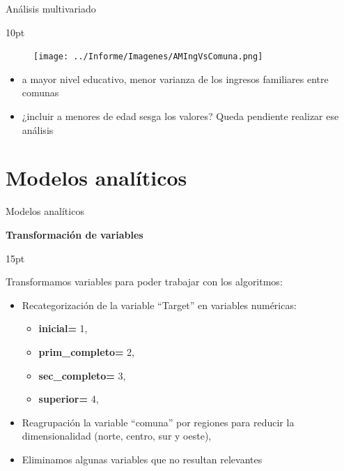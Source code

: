 \documentclass[pdf]{beamer}
\def\vspace{}%
\begin{document}
{\begin{frame}{Análisis multivariado}
    \begin{minipage}{0.55\textwidth}
        \vspace{10pt}
        \begin{figure} 
        \texttt{[image: ../Informe/Imagenes/AMIngVsComuna.png]}
        \end{figure}
    \end{minipage}
    \begin{minipage}{0.38\textwidth}
        \begin{itemize}
            \justifying%
            \item a mayor nivel educativo, menor varianza de los ingresos familiares entre comunas
            \item ¿incluir a menores de edad sesga los valores? Queda pendiente realizar ese análisis
        \end{itemize}
    \end{minipage}

\end{frame}

\section{Modelos analíticos}

\begin{frame}{Modelos analíticos}

    \begin{Large}
        \textbf{Transformación de variables}
    \end{Large}
    \vspace{15pt}

    Transformamos variables para poder trabajar con los algoritmos:
    \begin{itemize}
        \item Recategorización de la variable ``Target'' en variables numéricas:
        \begin{itemize}
            \item \textbf{inicial=} 1,
            \item \textbf{prim\_completo=} 2,
            \item \textbf{sec\_completo=} 3,
            \item \textbf{superior=} 4,
        \end{itemize}
        \item Reagrupación la variable ``comuna'' por regiones para reducir la dimensionalidad (norte, centro, sur y oeste),
        \item Eliminamos algunas variables que no resultan relevantes 
    \end{itemize}
    

\end{frame}}
\end{document}
